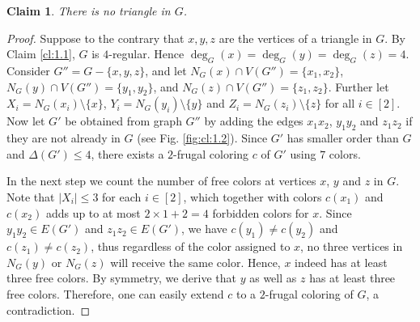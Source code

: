 \documentclass[11pt]{article}
\newtheorem{claim}{Claim}
\begin{document}
\begin{claim} There is no triangle in $G$.
\label{cl:1.2}
\end{claim} 
\begin{proof}
Suppose to the contrary that $x,y,z$ are the vertices of a triangle in $G$. By Claim \ref{cl:1.1}, $G$ is $4$-regular. Hence $\deg_G(x)=\deg_G(y)=\deg_G(z)=4$. Consider $G''=G-\{x,y,z\}$, and let $N_G(x) \cap V(G'')=\{x_1,x_2\}$, $N_G(y) \cap V(G'')=\{y_1,y_2\}$, and $N_G(z) \cap V(G'')=\{z_1,z_2\}$. Further let $X_i=N_G(x_i)\setminus\{x\}$, $Y_i=N_G(y_i)\setminus\{y\}$ and $Z_i=N_G(z_i)\setminus\{z\}$ for all $i \in [2]$. Now let $G'$ be obtained from graph $G''$ by adding the edges $x_1x_2$, $y_1y_2$ and $z_1z_2$ if they are not already in $G$ (see Fig. \ref{fig:cl:1.2}). Since $G'$ has smaller order than $G$ and $\Delta(G')\le 4$, there exists a $2$-frugal coloring $c$ of $G'$ using $7$ colors.

In the next step we count the number of free colors at vertices $x$, $y$ and $z$ in $G$. Note that $|X_i| \le 3$ for each $i\in [2]$, which together with colors $c(x_1)$ and $c(x_2)$ adds up to at most $2 \times 1 + 2=4$ forbidden colors for $x$. Since $y_1y_2 \in E(G')$ and $z_1z_2 \in E(G')$, we have $c(y_1) \ne c(y_2)$ and $c(z_1) \ne c(z_2)$, thus regardless of the color assigned to $x$, no three vertices in $N_G(y)$ or $N_G(z)$ will receive the same color. Hence, $x$ indeed has at least three free colors. By symmetry, we derive that 
 $y$ as well as $z$ has at least three free colors. 
Therefore, one can easily extend $c$ to a $2$-frugal coloring of $G$, a contradiction. 
\end{proof}
\end{document}
